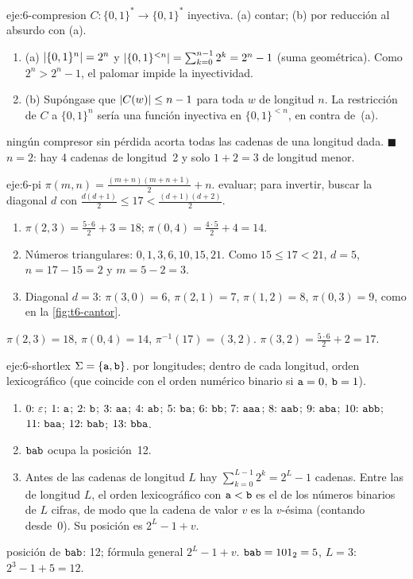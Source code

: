 \begin{solucion}{eje:6-compresion}
\datos $C\colon\{0,1\}^{*}\to\{0,1\}^{*}$ inyectiva.
\planteamiento (a) contar; (b) por reducción al absurdo con (a).
\pasos
\begin{enumerate}[label=\arabic*.]
  \item (a) $\lvert\{0,1\}^{n}\rvert=2^{n}$ y $\lvert\{0,1\}^{<n}\rvert=\sum_{k=0}^{n-1}2^{k}=2^{n}-1$ (suma geométrica). Como $2^{n}>2^{n}-1$, el palomar impide la inyectividad.
  \item (b) Supóngase que $\lvert C(w)\rvert\le n-1$ para toda $w$ de longitud $n$. La restricción de $C$ a $\{0,1\}^{n}$ sería una función inyectiva en $\{0,1\}^{<n}$, en contra de~(a).
\end{enumerate}
\resultado ningún compresor sin pérdida acorta todas las cadenas de una longitud dada. \hfill$\blacksquare$
\comprobacion $n=2$: hay 4 cadenas de longitud~2 y solo $1+2=3$ de longitud menor.
\end{solucion}

\begin{solucion}{eje:6-pi}
\datos $\pi(m,n)=\tfrac{(m+n)(m+n+1)}{2}+n$.
\planteamiento evaluar; para invertir, buscar la diagonal $d$ con $\tfrac{d(d+1)}{2}\le17<\tfrac{(d+1)(d+2)}{2}$.
\pasos
\begin{enumerate}[label=\arabic*.]
  \item $\pi(2,3)=\tfrac{5\cdot6}{2}+3=18$; $\pi(0,4)=\tfrac{4\cdot5}{2}+4=14$.
  \item Números triangulares: $0,1,3,6,10,15,21$. Como $15\le17<21$, $d=5$, $n=17-15=2$ y $m=5-2=3$.
  \item Diagonal $d=3$: $\pi(3,0)=6$, $\pi(2,1)=7$, $\pi(1,2)=8$, $\pi(0,3)=9$, como en la \cref{fig:t6-cantor}.
\end{enumerate}
\resultado $\pi(2,3)=18$, $\pi(0,4)=14$, $\pi^{-1}(17)=(3,2)$.
\comprobacion $\pi(3,2)=\tfrac{5\cdot6}{2}+2=17$.
\end{solucion}

\begin{solucion}{eje:6-shortlex}
\datos $\Sigma=\{\texttt{a},\texttt{b}\}$.
\planteamiento por longitudes; dentro de cada longitud, orden lexicográfico (que coincide con el orden numérico binario si $\texttt{a}=0$, $\texttt{b}=1$).
\pasos
\begin{enumerate}[label=\arabic*.]
  \item $0{:}\ \varepsilon$; $1{:}\ \texttt{a}$; $2{:}\ \texttt{b}$; $3{:}\ \texttt{aa}$; $4{:}\ \texttt{ab}$; $5{:}\ \texttt{ba}$; $6{:}\ \texttt{bb}$; $7{:}\ \texttt{aaa}$; $8{:}\ \texttt{aab}$; $9{:}\ \texttt{aba}$; $10{:}\ \texttt{abb}$; $11{:}\ \texttt{baa}$; $12{:}\ \texttt{bab}$; $13{:}\ \texttt{bba}$.
  \item $\texttt{bab}$ ocupa la posición~12.
  \item Antes de las cadenas de longitud $L$ hay $\sum_{k=0}^{L-1}2^{k}=2^{L}-1$ cadenas. Entre las de longitud $L$, el orden lexicográfico con $\texttt{a}<\texttt{b}$ es el de los números binarios de $L$ cifras, de modo que la cadena de valor $v$ es la $v$-ésima (contando desde~0). Su posición es $2^{L}-1+v$.
\end{enumerate}
\resultado posición de $\texttt{bab}$: 12; fórmula general $2^{L}-1+v$.
\comprobacion $\texttt{bab}=101_2=5$, $L=3$: $2^{3}-1+5=12$.
\end{solucion}

